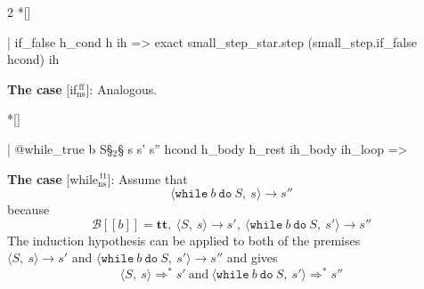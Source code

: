 \begin{paracol}{2}
\switchcolumn[1]*[]
\begin{leftcolumn}
    \begin{Lean_Code}
  | if_false h_cond h ih =>
    exact small_step_star.step
      (small_step.if_false
        hcond)
      ih
    \end{Lean_Code}
\end{leftcolumn}
\begin{rightcolumn}
\textbf{The case} [if$_{\text{ns}}^{\ \text{ff}}$]: Analogous.
\end{rightcolumn}
\vspace{2em}


\switchcolumn[1]*[]
\begin{leftcolumn}
    \begin{Lean_Code}
  | @while_true b S§\(_2\)§ s s' s''
    hcond h_body h_rest
    ih_body ih_loop =>
    \end{Lean_Code}
\end{leftcolumn}
\begin{rightcolumn}
\textbf{The case} [while$_{\text{ns}}^{\ \text{tt}}$]: Assume that
\[
\langle \mathtt{while}\ b\ \mathtt{do}\ S,\ s \rangle \to s''
\]
because
\[
\mathcal{B}[\![b]\!] = \mathbf{tt}, \ \langle S,\ s \rangle \to s', \ \langle \mathtt{while}\ b\ \mathtt{do}\ S,\ s' \rangle \to s''
\]
The induction hypothesis can be applied to both of the premises \\
\(\langle S,\ s \rangle \to s'\)
and \(\langle \mathtt{while}\ b\ \mathtt{do}\ S,\ s' \rangle \to s''\)
and gives
\[
\langle S,\ s \rangle \Rightarrow^{*} s'\ \mbox{and} \ \langle \mathtt{while}\ b\ \mathtt{do}\ S,\ s' \rangle \Rightarrow^{*} s''
\]
\end{rightcolumn}
\vspace{1em}



\end{paracol}
